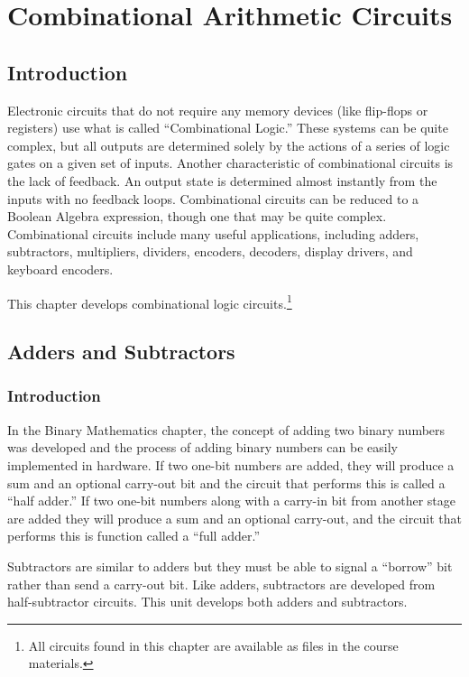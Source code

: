 \chapter{Combinational Arithmetic Circuits}\label{ch08}
\section{Introduction}

Electronic circuits that do not require any memory devices (like flip-flops or registers) use what is called ``Combinational Logic.'' These systems can be quite complex, but all outputs are determined solely by the actions of a series of logic gates on a given set of inputs. Another characteristic of combinational circuits is the lack of feedback. An output state is determined almost instantly from the inputs with no feedback loops. Combinational circuits can be reduced to a Boolean Algebra expression, though one that may be quite complex. Combinational circuits include many useful applications, including adders, subtractors, multipliers, dividers, encoders, decoders, display drivers, and keyboard encoders.
 
This chapter develops combinational logic circuits.\footnote{All circuits found in this chapter are available as \Le files in the course materials.}

\section{Adders and Subtractors}
\label{CL:sec:adders_and_subtractors}

\subsection{Introduction}
\label{CL:subsec:introduction_to_adders_and_subtractors}

In the Binary Mathematics chapter, the concept of adding two binary numbers was developed and the process of adding binary numbers can be easily implemented in hardware. If two one-bit numbers are added, they will produce a sum and an optional carry-out bit and the circuit that performs this is called a ``half adder.'' If two one-bit numbers along with a carry-in bit from another stage are added they will produce a sum and an optional carry-out, and the circuit that performs this is function called a ``full adder.'' 

Subtractors are similar to adders but they must be able to signal a ``borrow'' bit rather than send a carry-out bit. Like adders, subtractors are developed from half-subtractor circuits. This unit develops both adders and subtractors.

